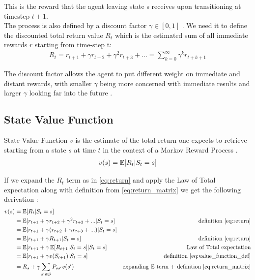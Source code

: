 This is the reward that the agent leaving state s receives upon transitioning at timestep $t+1$.\\

The process is also defined by a discount factor $\gamma \in [0, 1]$ \cite{lecture_lets_go_markov}. We need it to define the discounted total return value $R_t$ which is the estimated sum of all immediate rewards $r$ starting from time-step t:
\begin{align}
    R_t = r_{t+1} + \gamma r_{t+2} + \gamma ^2 r_{t+3} + ... = \sum^{\infty}_{k=0}\gamma^{k}r_{t+k+1} \label{eq:return}
\end{align}

The discount factor allows the agent to put different weight on immediate and distant rewards,
with smaller $\gamma$ being more concerned with immediate results and larger $\gamma$ looking far into the future \cite{lecture_lets_go_markov}. 

\subsection{State Value Function}
State Value Function $v$ is the estimate of the total return one expects to retrieve starting from a state $s$ at time $t$ in the context 
of a Markov Reward Process \cite{lecture_lets_go_markov}.
\begin{align}
    v(s) = \operatorname{\mathbb{E}}[R_t | S_t = s] \label{eq:value_function_def}
\end{align}

If we expand the $R_t$ term as in \ref{eq:return} and apply the Law of Total expectation along with definition from \ref{eq:return_matrix} we get the following derivation \cite{lecture_lets_go_markov}:
\begin{align}
    v(s) &= \operatorname{\mathbb{E}}[R_t | S_t = s] \label{eq:value_function}\\
         &= \operatorname{\mathbb{E}}[r_{t+1} + \gamma r_{t+2} + \gamma ^2 r_{t+3} + ... | S_t = s] & \text{definition \ref{eq:return}} \nonumber \\
         &= \operatorname{\mathbb{E}}[r_{t+1} + \gamma (r_{t+2} + \gamma r_{t+3} + ...) | S_t = s] \nonumber\\
         &= \operatorname{\mathbb{E}}[r_{t+1} + \gamma R_{t+1} | S_t = s] & \text{definition \ref{eq:return}}  \nonumber\\
         &= \operatorname{\mathbb{E}}[r_{t+1} + \gamma \operatorname{\mathbb{E}}[R_{t+1} | S_t = s] | S_t = s] & \text{Law of Total expectation}  \nonumber\\
         &= \operatorname{\mathbb{E}}[r_{t+1} + \gamma v(S_{t+1})| S_t = s] & \text{definition \ref{eq:value_function_def}}  \nonumber\\
         &= R_s + \gamma \sum_{s' \in S} P_{ss'}v(s') & \text{expanding $\operatorname{\mathbb{E}}$ term + definition  \ref{eq:return_matrix}} \nonumber
\end{align}

